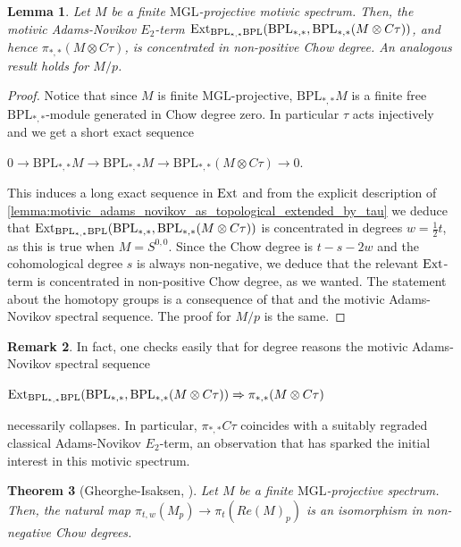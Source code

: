 \documentclass[oneside,a4paper]{amsart}
\newcommand{\Ext}{\textnormal{Ext}} %
\newcommand{\MGL}{\mathrm{MGL}} %
\newcommand{\BPL}{\mathrm{BPL}} %
\theoremstyle{plain}
\newtheorem{thm}{Theorem}[section]
\newtheorem{lemma}[thm]{Lemma}
\theoremstyle{definition}
\newtheorem{rem}[thm]{Remark}
\theoremstyle{remark}
\begin{document}
\begin{lemma}
\label{lemma:homotopy_of_cofibre_of_tau_concentrated_in_nonpositive_chow_degree}
Let $M$ be a finite $\MGL$-projective motivic spectrum. Then, the motivic Adams-Novikov $E_{2}$-term $\Ext _{\BPL_{*, *} \BPL} (\BPL_{*, *}, \BPL_{*, *} (M \otimes C\tau))$, and hence $\pi_{*, *} (M \otimes C \tau)$, is concentrated in non-positive Chow degree. An analogous result holds for $M / p$. 
\end{lemma}

\begin{proof}
Notice that since $M$ is finite $\MGL$-projective, $\BPL_{*, *} M$ is a finite free $\BPL_{*, *}$-module generated in Chow degree zero. In particular $\tau$ acts injectively and we get a short exact sequence 

\begin{center}
$0 \rightarrow \BPL_{*, *} M \rightarrow \BPL_{*, *} M \rightarrow \BPL_{*, *} (M \otimes C\tau) \rightarrow 0$.
\end{center}
This induces a long exact sequence in $\Ext$ and from the explicit description of \cref{lemma:motivic_adams_novikov_as_topological_extended_by_tau} we deduce that $\Ext _{\BPL_{*, *} \BPL} (\BPL_{*, *}, \BPL_{*, *} (M \otimes C\tau))$ is concentrated in degrees $w = \frac{1}{2} t$, as this is true when $M = S^{0, 0}$. Since the Chow degree is $t - s - 2w$ and the cohomological degree $s$ is always non-negative, we deduce that the relevant $\Ext$-term is concentrated in non-positive Chow degree, as we wanted. The statement about the homotopy groups is a consequence of that and the motivic Adams-Novikov spectral sequence. The proof for $M / p$ is the same. 
\end{proof}

\begin{rem}
In fact, one checks easily that for degree reasons the motivic Adams-Novikov spectral sequence 

\begin{center}
$\Ext _{\BPL_{*, *} \BPL} (\BPL_{*, *}, \BPL_{*, *} (M \otimes C\tau)) \Rightarrow \pi_{*, *} (M \otimes C \tau)$
\end{center}
necessarily collapses. In particular, $\pi_{*, *} C \tau$ coincides with a suitably regraded classical Adams-Novikov $E_{2}$-term, an observation that has sparked the initial interest in this motivic spectrum.
\end{rem}

\begin{thm}[Gheorghe-Isaksen, \cite{gheorghe2017structure}]
\label{thm:gheorghe_isaksen_p_complete_homotopy_in_nonneg_chow_degree_is_topological}
Let $M$ be a finite $\MGL$-projective spectrum. Then, the natural map $\pi_{t, w}(M_{p}) \rightarrow \pi_{t}(Re(M)_{p})$ is an isomorphism in non-negative Chow degrees.
\end{thm}
\end{document}
